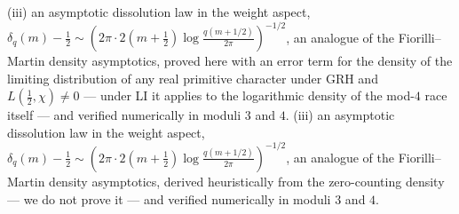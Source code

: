 %
(iii) an asymptotic dissolution law in the weight
aspect, $\delta_q(m)-\tfrac12\sim(2\pi\cdot
2(m+\tfrac12)\log\tfrac{q(m+1/2)}{2\pi})^{-1/2}$, an analogue of the
Fiorilli--Martin density asymptotics, proved here with an error term
for the density of the limiting distribution of any real primitive
character under GRH and $L(\tfrac12,\chi)\neq0$ --- under LI it applies
to the logarithmic density of the mod-$4$ race itself --- and verified
numerically in moduli $3$ and $4$.
%
(iii) an asymptotic dissolution law in the weight
aspect, $\delta_q(m)-\tfrac12\sim(2\pi\cdot
2(m+\tfrac12)\log\tfrac{q(m+1/2)}{2\pi})^{-1/2}$, an analogue of the
Fiorilli--Martin density asymptotics, derived heuristically from the
zero-counting density --- we do not prove it --- and verified
numerically in moduli $3$ and $4$.


